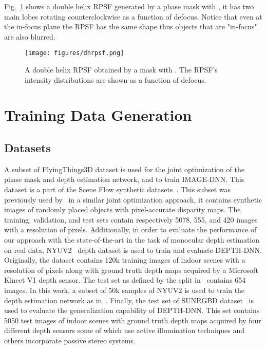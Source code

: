 \documentclass[preprint,5p,twocolumn]{elsarticle}
\begin{document}
Fig.~\ref{fig:dhrpsf} shows a double helix RPSF generated by a phase mask with , it has two main lobes rotating counterclockwise as a function of defocus. Notice that even at the in-focus plane the RPSF has the same shape thus objects that are "in-focus" are also blurred.

\begin{figure}[h!]
    \centering
    \texttt{[image: figures/dhrpsf.png]}
    \caption{A double helix RPSF obtained by a mask with . The RPSF's intensity distributions are shown as a function of defocus.}
    \label{fig:dhrpsf}
\end{figure}
 
\section{Training Data Generation}
\label{sec:data}
\subsection{Datasets}
A subset of FlyingThings3D dataset is used for the joint optimization of the phase mask and depth estimation network, and to train IMAGE-DNN. This dataset is a part of the Scene Flow synthetic datasets~\cite{MIFDB16}. This subset was previously used by~\cite{wu2019phasecam3d} in a similar joint optimization approach, it contains synthetic images of randomly placed objects with pixel-accurate disparity maps. The training, validation, and test sets contain respectively 5078, 555, and 420 images with a resolution of  pixels. Additionally, in order to evaluate the performance of our approach with the state-of-the-art in the task of monocular depth estimation on real data, NYUV2~\cite{eigen2014depth} depth dataset is used to train and evaluate DEPTH-DNN. Originally, the dataset contains 120k training images of indoor scenes with a resolution of  pixels along with ground truth depth maps acquired by a Microsoft Kinect V1 depth sensor. The test set as defined by the  split in~\cite{eigen2015predicting} contains 654 images. In this work, a subset of 50k samples of NYUV2 is used to train the depth estimation network as in~\cite{bhat2020adabins}. Finally, the test set of SUNRGBD dataset~\cite{song2015sun} is used to evaluate the generalization capability of DEPTH-DNN. This set contains 5050 test images of indoor scenes with ground truth depth maps acquired by four different depth sensors some of which use active illumination techniques and others incorporate passive stereo systems.
\end{document}
